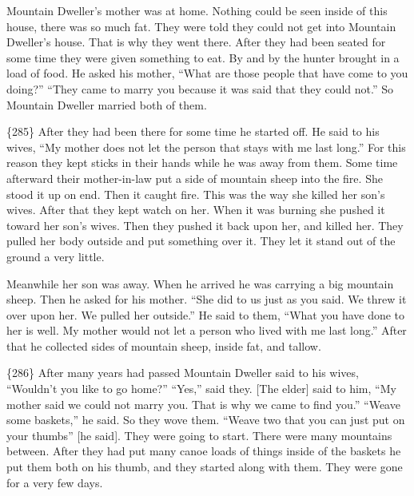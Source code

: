 Mountain Dweller’s mother was at home.
Nothing could be seen inside of this house, there was so much fat.
They were told they could not get into Mountain Dweller’s house.
That is why they went there.
After they had been seated for some time they were given something to eat.
By and by the hunter brought in a load of food.
He asked his mother,
“What are those people that have come to you doing?”
“They came to marry you because it was said that they could not.”
So Mountain Dweller married both of them.

\{285\}
After they had been there for some time he started off.
He said to his wives,
“My mother does not let the person that stays with me last long.”
For this reason they kept sticks in their hands while he was away from them.
Some time afterward their mother-in-law put a side of mountain sheep into the fire.
She stood it up on end.
Then it caught fire.
This was the way she killed her son’s wives.
After that they kept watch on her.
When it was burning she pushed it toward her son’s wives.
Then they pushed it back upon her, and killed her.
They pulled her body outside and put something over it.
They let it stand out of the ground a very little.

Meanwhile her son was away.
When he arrived he was carrying a big mountain sheep.
Then he asked for his mother.
“She did to us just as you said.
We threw it over upon her.
We pulled her outside.”
He said to them,
“What you have done to her is well.
My mother would not let a person who lived with me last long.”
After that he collected sides of mountain sheep, inside fat, and tallow.

\{286\}
After many years had passed Mountain Dweller said to his wives,
“Wouldn’t you like to go home?”
“Yes,” said they.
{}[The elder] said to him,
“My mother said we could not marry you.
That is why we came to find you.”
“Weave some baskets,”
he said.
So they wove them.
“Weave two that you can just put on your thumbs” [he said].
They were going to start.
There were many mountains between.
After they had put many canoe loads of things inside of the baskets he put them both on his thumb, and they started along with them.
They were gone for a very few days.

